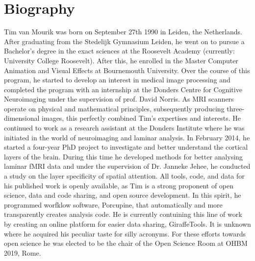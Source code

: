 \section{Biography}
Tim van Mourik was born on September 27th 1990 in Leiden, the Netherlands. After graduating from the Stedelijk Gymnasium Leiden, he went on to pursue a Bachelor's degree in the exact sciences at the Roosevelt Academy (currently: University College Roosevelt). After this, he enrolled in the Master Computer Animation and Visual Effects at Bournemouth University. Over the course of this program, he started to develop an interest in medical image processing and completed the program with an internship at the Donders Centre for Cognitive Neuroimaging under the supervision of prof. David Norris. As MRI scanners operate on physical and mathematical principles, subsequently producing three-dimensional images, this perfectly combined Tim's expertises and interests. He continued to work as a research assistant at the Donders Institute where he was initiated in the world of neuroimaging and laminar analysis. In February 2014, he started a four-year PhD project to investigate and better understand the cortical layers of the brain. During this time he developed methods for better analysing laminar fMRI data and under the supervision of Dr. Janneke Jehee, he conducted a study on the layer specificity of spatial attention. All tools, code, and data for his published work is openly available, as Tim is a strong proponent of open science, data and code sharing, and open source development. In this spirit, he programmed worfklow software, Porcupine, that automatically and more transparently creates analysis code. He is currently contuining this line of work by creating an online platform for easier data sharing, GiraffeTools. It is unknown where he acquired his peculiar taste for silly acronyms. For these efforts towards open science he was elected to be the chair of the Open Science Room at OHBM 2019, Rome. 
